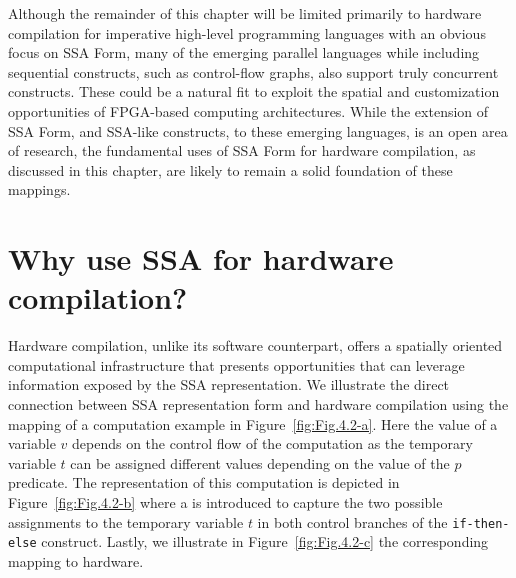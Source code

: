 Although the remainder of this chapter will be limited primarily to hardware compilation for imperative high-level programming languages with an obvious focus on SSA Form, many of the emerging parallel languages while including sequential constructs, such as control-flow graphs, also support truly concurrent constructs. These could be a natural fit to exploit the spatial and customization opportunities of FPGA-based computing architectures.
%
While the extension of SSA Form, and SSA-like constructs, to these emerging languages, is an open area of research, the fundamental uses of SSA Form for hardware compilation, as discussed in this chapter, are likely to remain a solid foundation of these mappings.

\section{Why use SSA for hardware compilation?}
Hardware compilation, unlike its software counterpart, offers a spatially oriented computational infrastructure that presents opportunities that can leverage information exposed by the SSA representation. 
We illustrate the direct connection between SSA representation form and hardware compilation using the mapping of a computation example in Figure~\ref{fig:Fig.4.2-a}. 
Here the value of a variable $v$ depends on the control flow of the computation as the temporary variable $t$ can be assigned different values depending on the value of the $p$ predicate. 
The representation of this computation is depicted in Figure~\ref{fig:Fig.4.2-b} where a \phifun is introduced to capture the two possible assignments to the temporary variable $t$ in both control branches of the {\tt if-then-else} construct. 
Lastly, we illustrate in Figure~\ref{fig:Fig.4.2-c} the corresponding mapping to hardware.

